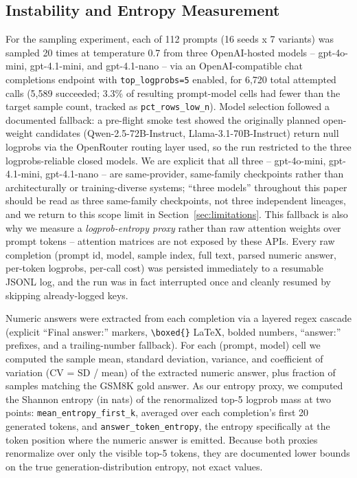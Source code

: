 \documentclass[11pt,letterpaper]{article}
\begin{document}
\subsection{Instability and Entropy Measurement}
\label{sec:instability-measurement}

For the sampling experiment, each of 112 prompts (16 seeds x 7 variants) was sampled 20 times at temperature 0.7 from three OpenAI-hosted models -- gpt-4o-mini, gpt-4.1-mini, and gpt-4.1-nano -- via an OpenAI-compatible chat completions endpoint with \texttt{top\_logprobs=5} enabled, for 6,720 total attempted calls (5,589 succeeded; 3.3\% of resulting prompt-model cells had fewer than the target sample count, tracked as \texttt{pct\_rows\_low\_n}). Model selection followed a documented fallback: a pre-flight smoke test showed the originally planned open-weight candidates (Qwen-2.5-72B-Instruct, Llama-3.1-70B-Instruct) return null logprobs via the OpenRouter routing layer used, so the run restricted to the three logprobs-reliable closed models. We are explicit that all three -- gpt-4o-mini, gpt-4.1-mini, gpt-4.1-nano -- are same-provider, same-family checkpoints rather than architecturally or training-diverse systems; ``three models'' throughout this paper should be read as three same-family checkpoints, not three independent lineages, and we return to this scope limit in Section~\ref{sec:limitations}. This fallback is also why we measure a \emph{logprob-entropy proxy} rather than raw attention weights over prompt tokens -- attention matrices are not exposed by these APIs. Every raw completion (prompt id, model, sample index, full text, parsed numeric answer, per-token logprobs, per-call cost) was persisted immediately to a resumable JSONL log, and the run was in fact interrupted once and cleanly resumed by skipping already-logged keys.

Numeric answers were extracted from each completion via a layered regex cascade (explicit ``Final answer:'' markers, \texttt{\textbackslash boxed\{\}} LaTeX, bolded numbers, ``answer:'' prefixes, and a trailing-number fallback). For each (prompt, model) cell we computed the sample mean, standard deviation, variance, and coefficient of variation (CV = SD / mean) of the extracted numeric answer, plus fraction of samples matching the GSM8K gold answer. As our entropy proxy, we computed the Shannon entropy (in nats) of the renormalized top-5 logprob mass at two points: \texttt{mean\_entropy\_first\_k}, averaged over each completion's first 20 generated tokens, and \texttt{answer\_token\_entropy}, the entropy specifically at the token position where the numeric answer is emitted. Because both proxies renormalize over only the visible top-5 tokens, they are documented lower bounds on the true generation-distribution entropy, not exact values.
\end{document}
